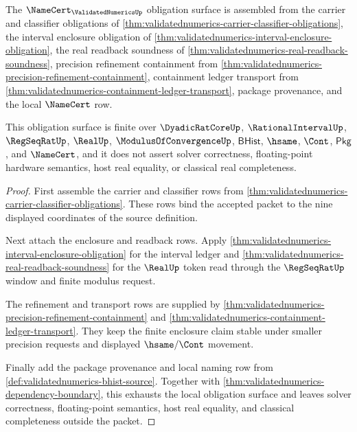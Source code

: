 \begin{theorem}
\label{thm:validatednumerics-namecert-obligation-surface}
The $\NameCert_{\ValidatedNumericsUp}$ obligation surface is assembled from the
carrier and classifier obligations of
\autoref{thm:validatednumerics-carrier-classifier-obligations}, the interval
enclosure obligation of
\autoref{thm:validatednumerics-interval-enclosure-obligation}, the real readback
soundness of \autoref{thm:validatednumerics-real-readback-soundness}, precision
refinement containment from
\autoref{thm:validatednumerics-precision-refinement-containment}, containment
ledger transport from
\autoref{thm:validatednumerics-containment-ledger-transport}, package
provenance, and the local $\NameCert$ row.

This obligation surface is finite over $\DyadicRatCoreUp$,
$\RationalIntervalUp$, $\RegSeqRatUp$, $\RealUp$,
$\ModulusOfConvergenceUp$, $\mathsf{BHist}$, $\hsame$, $\Cont$,
$\mathsf{Pkg}$, and $\NameCert$, and it does not assert solver correctness,
floating-point hardware semantics, host real equality, or classical real
completeness.
\end{theorem}
\begin{proof}
First assemble the carrier and classifier rows from
\autoref{thm:validatednumerics-carrier-classifier-obligations}. These rows bind
the accepted packet to the nine displayed coordinates of the source definition.

Next attach the enclosure and readback rows. Apply
\autoref{thm:validatednumerics-interval-enclosure-obligation} for the interval
ledger and \autoref{thm:validatednumerics-real-readback-soundness} for the
$\RealUp$ token read through the $\RegSeqRatUp$ window and finite modulus
request.

The refinement and transport rows are supplied by
\autoref{thm:validatednumerics-precision-refinement-containment} and
\autoref{thm:validatednumerics-containment-ledger-transport}. They keep the
finite enclosure claim stable under smaller precision requests and displayed
$\hsame/\Cont$ movement.

Finally add the package provenance and local naming row from
\autoref{def:validatednumerics-bhist-source}. Together with
\autoref{thm:validatednumerics-dependency-boundary}, this exhausts the local
obligation surface and leaves solver correctness, floating-point semantics,
host real equality, and classical completeness outside the packet.
\end{proof}

